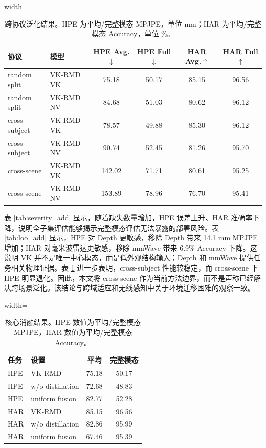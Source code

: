 \documentclass[journal]{IEEEtran}
\newcommand{\parahead}[1]{\vspace{0.4em}\noindent{\textbf{#1}}}
\begin{document}
\begin{table}[!t]
\centering
\caption{跨协议泛化结果。HPE 为平均/完整模态 MPJPE，单位 mm；HAR 为平均/完整模态 Accuracy，单位 \%。}
\label{tab:protocol_add}
\scriptsize
\begin{adjustbox}{width=\textwidth}
\begin{tabular}{llcccc}
\toprule
协议 & 模型 & HPE Avg.$\downarrow$ & HPE Full$\downarrow$ & HAR Avg.$\uparrow$ & HAR Full$\uparrow$ \\
\midrule
random split & VK-RMD VK & 75.18 & 50.17 & 85.15 & 96.56 \\
random split & VK-RMD NV & 84.68 & 51.03 & 80.62 & 96.12 \\
\midrule
cross-subject & VK-RMD VK & 78.57 & 49.88 & 85.30 & 96.12 \\
cross-subject & VK-RMD NV & 90.74 & 52.45 & 81.26 & 95.70 \\
\midrule
cross-scene & VK-RMD VK & 142.02 & 71.71 & 80.61 & 95.25 \\
cross-scene & VK-RMD NV & 153.89 & 78.96 & 76.70 & 95.41 \\
\bottomrule
\end{tabular}
\end{adjustbox}
\end{table}

表 \ref{tab:severity_add} 显示，随着缺失数量增加，HPE 误差上升、HAR 准确率下降，说明全子集评估能够揭示完整模态评估无法暴露的部署风险。表 \ref{tab:loo_add} 显示，HPE 对 Depth 更敏感，移除 Depth 带来 14.1 mm MPJPE 增加；HAR 对毫米波雷达更敏感，移除 mmWave 带来 6.9\% Accuracy 下降。这说明 VK 并不是唯一中心模态，而是低外观结构输入；Depth 和 mmWave 提供任务相关物理证据。表 \ref{tab:protocol_add} 进一步表明，cross-subject 性能较稳定，而 cross-scene 下 HPE 明显退化。因此，本文将 cross-scene 作为当前方法边界，而不是声称已经解决跨场景泛化。该结论与跨域适应和无线感知中关于环境迁移困难的观察一致\cite{domainAdapt,adapose,robustwifi,rfpose,mmwaveHar}。

\parahead{消融、低视觉暴露探针与 IoT 部署成本。}
\begin{table}[!t]
\centering
\caption{核心消融结果。HPE 数值为平均/完整模态 MPJPE，HAR 数值为平均/完整模态 Accuracy。}
\label{tab:ablation_add}
\scriptsize
\begin{adjustbox}{width=\linewidth}
\begin{tabular}{llcc}
\toprule
任务 & 设置 & 平均 & 完整模态 \\
\midrule
HPE & VK-RMD & 75.18 & 50.17 \\
HPE & w/o distillation & 72.68 & 48.83 \\
HPE & uniform fusion & 82.77 & 52.28 \\
HAR & VK-RMD & 85.15 & 96.56 \\
HAR & w/o distillation & 82.86 & 95.99 \\
HAR & uniform fusion & 67.46 & 95.39 \\
\bottomrule
\end{tabular}
\end{adjustbox}
\end{table}
\end{document}
